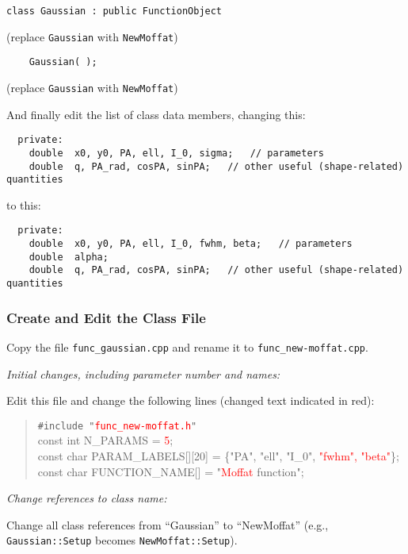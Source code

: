 \documentclass[10pt]{article}
\newcommand{\red}{\textcolor{red}}
\begin{document}
\begin{verbatim}
class Gaussian : public FunctionObject
\end{verbatim}
(replace \texttt{Gaussian} with \texttt{NewMoffat})

\begin{verbatim}
    Gaussian( );
\end{verbatim}
(replace \texttt{Gaussian} with \texttt{NewMoffat})

And finally edit the list of class data members, changing this:
\begin{verbatim}
  private:
    double  x0, y0, PA, ell, I_0, sigma;   // parameters
    double  q, PA_rad, cosPA, sinPA;   // other useful (shape-related) quantities
\end{verbatim}
to this:
\begin{verbatim}
  private:
    double  x0, y0, PA, ell, I_0, fwhm, beta;   // parameters
    double  alpha;
    double  q, PA_rad, cosPA, sinPA;   // other useful (shape-related) quantities
\end{verbatim}


\subsubsection{Create and Edit the Class File}

Copy the file \texttt{func\_gaussian.cpp} and rename it to \texttt{func\_new-moffat.cpp}. 

\bigskip
\noindent \textit{Initial changes, including parameter number and names:}
\smallskip

Edit this file and change the following lines (changed text indicated in red):

\begin{quote}
\texttt{\#include "\red{func\_new-moffat.h}"} \\

const int  N\_PARAMS = \red{5}; \\

const char  PARAM\_LABELS[][20] = \{"PA", "ell", "I\_0", \red{"fwhm", "beta"}\}; \\

const char  FUNCTION\_NAME[] = "\red{Moffat} function";

\end{quote}

\bigskip
\noindent \textit{Change references to class name:}
\smallskip

Change all class references from ``Gaussian'' to ``NewMoffat'' (e.g., \texttt{Gaussian::Setup}
becomes \texttt{NewMoffat::Setup}).
\end{document}
